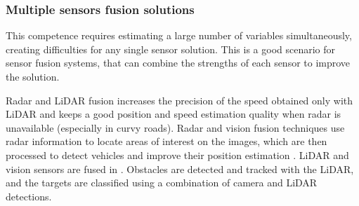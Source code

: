 
\subsubsection{Multiple sensors fusion solutions}
This competence requires estimating a large number of variables simultaneously,
creating difficulties for any single sensor solution. This is a good scenario
for sensor fusion systems, that can combine the strengths of each sensor to
improve the solution. 

Radar and LiDAR fusion \cite{gohring2011radar} increases the precision of 
the speed obtained only with LiDAR and keeps a good position and speed 
estimation quality when radar is unavailable (especially in curvy roads).
Radar and vision fusion techniques use radar information to locate areas of 
interest on the images, which are then processed to detect vehicles and improve 
their position estimation \cite{alessandretti2007vehicle}.
LiDAR and vision sensors are fused in \cite{premebida2007lidar}. Obstacles
are detected and tracked with the LiDAR, and the targets are classified using
a combination of camera and LiDAR detections.

